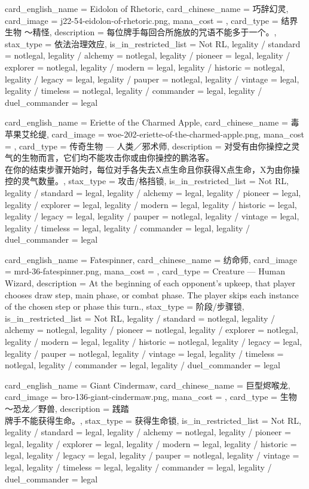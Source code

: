 \documentclass[lang = cn, color = black, 10pt]{AllThatStax}
\begin{document}
\card
{
	card_english_name = {Eidolon of Rhetoric},
	card_chinese_name = {巧辞幻灵},
	card_image = j22-54-eidolon-of-rhetoric.png,
	mana_cost = ,
	card_type = 结界生物 ～精怪,
	description = {每位牌手每回合所施放的咒语不能多于一个。},
	stax_type = 依法治理效应,
	is_in_restricted_list = Not RL,
	legality / standard = notlegal,
	legality / alchemy = notlegal,
	legality / pioneer = legal,
	legality / explorer = notlegal,
	legality / modern = legal,
	legality / historic = notlegal,
	legality / legacy = legal,
	legality / pauper = notlegal,
	legality / vintage = legal,
	legality / timeless = notlegal,
	legality / commander = legal,
	legality / duel_commander = legal
}

\card
{
	card_english_name = {Eriette of the Charmed Apple},
	card_chinese_name = {毒苹果艾纶缇},
	card_image = woe-202-eriette-of-the-charmed-apple.png,
	mana_cost = ,
	card_type = 传奇生物 — 人类／邪术师,
	description = {对受有由你操控之灵气的生物而言，它们均不能攻击你或由你操控的鹏洛客。\\
		在你的结束步骤开始时，每位对手各失去X点生命且你获得X点生命，X为由你操控的灵气数量。},
	stax_type = 攻击/格挡锁,
	is_in_restricted_list = Not RL,
	legality / standard = legal,
	legality / alchemy = legal,
	legality / pioneer = legal,
	legality / explorer = legal,
	legality / modern = legal,
	legality / historic = legal,
	legality / legacy = legal,
	legality / pauper = notlegal,
	legality / vintage = legal,
	legality / timeless = legal,
	legality / commander = legal,
	legality / duel_commander = legal
}

\card
{
	card_english_name = {Fatespinner},
	card_chinese_name = {纺命师},
	card_image = mrd-36-fatespinner.png,
	mana_cost = ,
	card_type = Creature — Human Wizard,
	description = {At the beginning of each opponent's upkeep, that player chooses draw step, main phase, or combat phase. The player skips each instance of the chosen step or phase this turn.},
	stax_type = 阶段/步骤锁,
	is_in_restricted_list = Not RL,
	legality / standard = notlegal,
	legality / alchemy = notlegal,
	legality / pioneer = notlegal,
	legality / explorer = notlegal,
	legality / modern = legal,
	legality / historic = notlegal,
	legality / legacy = legal,
	legality / pauper = notlegal,
	legality / vintage = legal,
	legality / timeless = notlegal,
	legality / commander = legal,
	legality / duel_commander = legal
}

\card
{
	card_english_name = {Giant Cindermaw},
	card_chinese_name = {巨型烬喉龙},
	card_image = bro-136-giant-cindermaw.png,
	mana_cost = ,
	card_type = 生物 ～恐龙／野兽,
	description = {践踏\\
		牌手不能获得生命。},
	stax_type = 获得生命锁,
	is_in_restricted_list = Not RL,
	legality / standard = legal,
	legality / alchemy = notlegal,
	legality / pioneer = legal,
	legality / explorer = legal,
	legality / modern = legal,
	legality / historic = legal,
	legality / legacy = legal,
	legality / pauper = notlegal,
	legality / vintage = legal,
	legality / timeless = legal,
	legality / commander = legal,
	legality / duel_commander = legal
}
\end{document}
